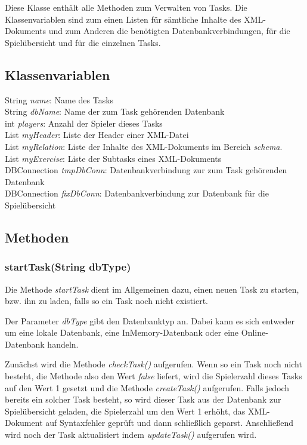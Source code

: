 \documentclass[11pt]{report}
\begin{document}
Diese Klasse enthält alle Methoden zum Verwalten von Tasks. Die Klassenvariablen sind zum einen Listen für sämtliche Inhalte des XML-Dokuments und zum Anderen die benötigten Datenbankverbindungen, für die Spielübersicht und für die einzelnen Tasks.

\subsection*{Klassenvariablen}
String \textit{name}: Name des Tasks \\
String \textit{dbName}: Name der zum Task gehörenden Datenbank \\
int \textit{players}: Anzahl der Spieler dieses Tasks \\
List \textit{myHeader}: Liste der Header einer XML-Datei \\
List \textit{myRelation}: Liste der Inhalte des XML-Dokuments im Bereich \textit{schema}. \\
List \textit{myExercise}: Liste der Subtasks eines XML-Dokuments \\
DBConnection \textit{tmpDbConn}: Datenbankverbindung zur zum Task gehörenden Datenbank \\
DBConnection \textit{fixDbConn}: Datenbankverbindung zur Datenbank für die Spielübersicht

\subsection*{Methoden}

\subsubsection*{startTask(String dbType)}	

Die Methode \textit{startTask} dient im Allgemeinen dazu, einen neuen Task zu starten, bzw. ihn zu laden, falls so ein Task noch nicht existiert.

Der Parameter \textit{dbType} gibt den Datenbanktyp an. Dabei kann es sich entweder um eine lokale Datenbank, eine InMemory-Datenbank oder eine Online-Datenbank handeln.

Zunächst wird die Methode \textit{checkTask()} aufgerufen. Wenn so ein Task noch nicht besteht, die Methode also den Wert \textit{false} liefert, wird die Spielerzahl dieses Tasks auf den Wert 1 gesetzt und die Methode \textit{createTask()} aufgerufen. Falls jedoch bereits ein solcher Task besteht, so wird dieser Task aus der Datenbank zur Spielübersicht geladen, die Spielerzahl um den Wert 1 erhöht, das XML-Dokument auf Syntaxfehler geprüft und dann schließlich geparst. Anschließend wird noch der Task aktualisiert indem \textit{updateTask()} aufgerufen wird.
	
\end{document}

